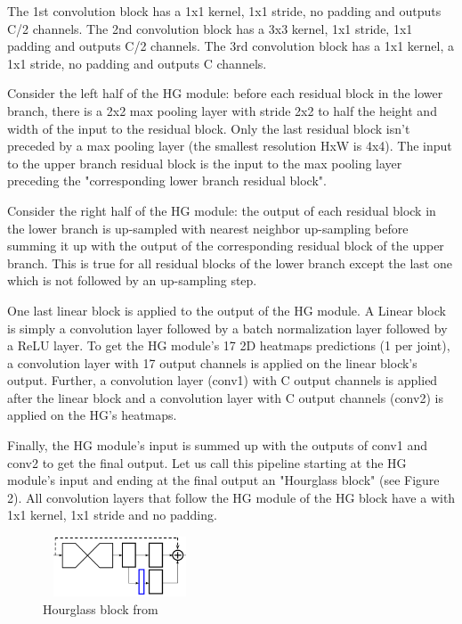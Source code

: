 \documentclass[sigconf]{acmart}
\begin{document}
The 1st convolution block has a 1x1 kernel, 1x1 stride, no padding and outputs C/2 channels. The 2nd convolution block has a 3x3 kernel, 1x1 stride, 1x1 padding and outputs C/2 channels. The 3rd convolution block has a 1x1 kernel, a 1x1 stride, no padding and outputs C channels.

Consider the left half of the HG module: before each residual block in the lower branch, there is a 2x2 max pooling layer with stride 2x2 to half the height and width of the input to the residual block. Only the last residual block isn't preceded by a max pooling layer (the smallest resolution HxW is 4x4). The input to the upper branch residual block is the input to the max pooling layer preceding the "corresponding lower branch residual block".

Consider the right half of the HG module: the output of each residual block in the lower branch is up-sampled with nearest neighbor up-sampling before summing it up with the output of the corresponding residual block of the upper branch. This is true for all residual blocks of the lower branch except the last one which is not followed by an up-sampling step.

One last linear block is applied to the output of the HG module. A Linear block is simply a convolution layer followed by a batch normalization layer followed by a ReLU layer. To get the HG module's 17 2D heatmaps predictions (1 per joint), a convolution layer with 17 output channels is applied on the linear block's output. Further, a convolution layer (conv1) with C output channels is applied after the linear block and a convolution layer with C output channels (conv2) is applied on the HG's heatmaps.

Finally, the HG module's input is summed up with the outputs of conv1 and conv2 to get the final output. Let us call this pipeline starting at the HG module's input and ending at the final output an "Hourglass block" (see Figure 2). All convolution layers that follow the HG module of the HG block have a with 1x1 kernel, 1x1 stride and no padding. 

\begin{figure}
\includegraphics[height=0.7in, width=1.8in]{img/hg_block.png}
\caption{Hourglass block from \cite{newell}}
\end{figure}
\end{document}
